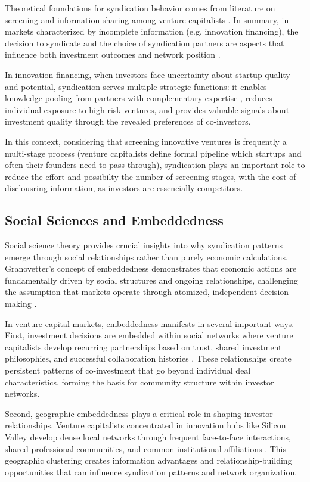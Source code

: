 Theoretical foundations for syndication behavior comes from literature on screening and information sharing among venture capitalists \cite{Casamatta2007}. In summary, in markets characterized by incomplete information (e.g. innovation financing), the decision to syndicate and the choice of syndication partners are aspects that influence both investment outcomes and network position \cite{Casamatta2007}.

In innovation financing, when investors face uncertainty about startup quality and potential, syndication serves multiple strategic functions: it enables knowledge pooling from partners with complementary expertise \cite{Lerner1994}, reduces individual exposure to high-risk ventures, and provides valuable signals \cite{Spence1981} about investment quality through the revealed preferences of co-investors. 

In this context, considering that screening innovative ventures is frequently a multi-stage process (venture capitalists define formal pipeline which startups and often their founders need to pass through), syndication plays an important role to reduce the effort and possibilty the number of screening stages, with the cost of disclousring information, as investors are essencially competitors.

\subsection{Social Sciences and Embeddedness}

Social science theory provides crucial insights into why syndication patterns emerge through social relationships rather than purely economic calculations. Granovetter's concept of embeddedness demonstrates that economic actions are fundamentally driven by social structures and ongoing relationships, challenging the assumption that markets operate through atomized, independent decision-making \cite{Granovetter1985}.

In venture capital markets, embeddedness manifests in several important ways. First, investment decisions are embedded within social networks where venture capitalists develop recurring partnerships based on trust, shared investment philosophies, and successful collaboration histories \cite{Granovetter1985}. These relationships create persistent patterns of co-investment that go beyond individual deal characteristics, forming the basis for community structure within investor networks.

Second, geographic embeddedness plays a critical role in shaping investor relationships. Venture capitalists concentrated in innovation hubs like Silicon Valley develop dense local networks through frequent face-to-face interactions, shared professional communities, and common institutional affiliations \cite{Granovetter1985}. This geographic clustering creates information advantages and relationship-building opportunities that can influence syndication patterns and network organization.

